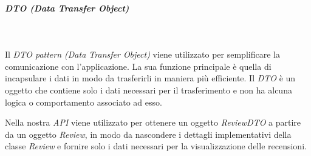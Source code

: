 \subparagraph*{DTO (Data Transfer Object)}~

\noindent Il \textit{DTO pattern (Data Transfer Object)} viene utilizzato per semplificare la comunicazione con l'applicazione. La sua funzione principale è quella di incapsulare i dati in modo da trasferirli in maniera più efficiente. Il \textit{DTO} è un oggetto che contiene solo i dati necessari per il trasferimento e non ha alcuna logica o comportamento associato ad esso.

Nella nostra \textit{API} viene utilizzato per ottenere un oggetto \textit{ReviewDTO} a partire da un oggetto \textit{Review}, in modo da nascondere i dettagli implementativi della classe \textit{Review} e fornire solo i dati necessari per la visualizzazione delle recensioni.

\pagebreak